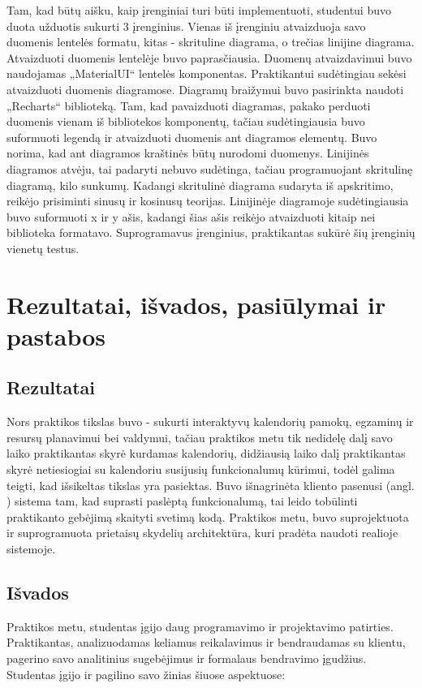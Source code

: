 \documentclass{VUMIFPSbakalaurinis}
\begin{document}
Tam, kad būtų aišku, kaip įrenginiai turi būti implementuoti, studentui buvo duota užduotis sukurti 3 įrenginius. Vienas iš įrenginiu atvaizduoja savo duomenis lentelės formatu, kitas - skrituline diagrama, o trečias linijine diagrama. Atvaizduoti duomenis lentelėje buvo paprasčiausia. Duomenų atvaizdavimui buvo naudojamas „MaterialUI“ lentelės komponentas. Praktikantui sudėtingiau sekėsi atvaizduoti duomenis diagramose. Diagramų braižymui buvo pasirinkta naudoti „Recharts“ biblioteką. Tam, kad pavaizduoti diagramas, pakako perduoti duomenis vienam iš bibliotekos komponentų, tačiau sudėtingiausia buvo suformuoti legendą ir atvaizduoti duomenis ant diagramos elementų. Buvo norima, kad ant diagramos kraštinės būtų nurodomi duomenys. Linijinės diagramos atvėju, tai padaryti nebuvo sudėtinga, tačiau programuojant skritulinę diagramą, kilo sunkumų. Kadangi skritulinė diagrama sudaryta iš apskritimo, reikėjo prisiminti sinusų ir kosinusų teorijas. Linijinėje diagramoje sudėtingiausia buvo suformuoti x ir y ašis, kadangi šias ašis reikėjo atvaizduoti kitaip nei biblioteka formatavo. Suprogramavus įrenginius, praktikantas sukūrė šių įrenginių vienetų testus.

\section{Rezultatai, išvados, pasiūlymai ir pastabos}

\subsection{Rezultatai}
Nors praktikos tikslas buvo - sukurti interaktyvų kalendorių pamokų, egzaminų ir resursų planavimui bei valdymui, tačiau praktikos metu tik nedidelę dalį savo laiko praktikantas skyrė kurdamas kalendorių, didžiausią laiko dalį praktikantas skyrė netiesiogiai su kalendoriu susijusių funkcionalumų kūrimui, todėl galima teigti, kad išsikeltas tikslas yra pasiektas. Buvo išnagrinėta kliento pasenusi (angl. ) sistema tam, kad suprasti paslėptą funkcionalumą, tai leido tobūlinti praktikanto gebėjimą skaityti svetimą kodą. Praktikos metu, buvo suprojektuota ir suprogramuota prietaisų skydelių architektūra, kuri pradėta naudoti realioje sistemoje.

\subsection{Išvados}
Praktikos metu, studentas įgijo daug programavimo ir projektavimo patirties. Praktikantas, analizuodamas keliamus reikalavimus ir bendraudamas su klientu, pagerino savo analitinius sugebėjimus ir formalaus bendravimo įgudžius. Studentas įgijo ir pagilino savo žinias šiuose aspektuose:
\end{document}
